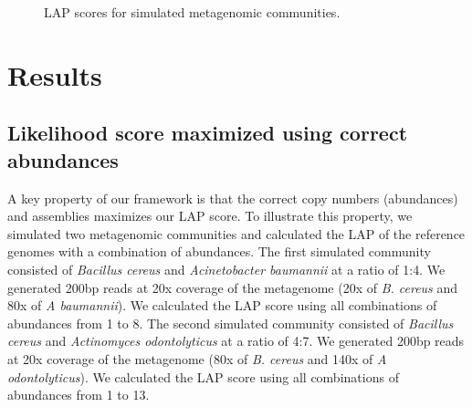 \documentclass[conference]{IEEEtran}
\begin{document}
\begin{figure}[tbhp!]
\centering
\label{fig:ref_abun}

\hfil
{}

\centering \caption{LAP scores for simulated metagenomic communities.}
\end{figure}

\section{Results}
\subsection{Likelihood score maximized using correct abundances}
A key property of our framework is that the correct copy numbers (abundances) and assemblies maximizes our LAP score.
To illustrate this property, we simulated two metagenomic communities and calculated the LAP of the reference genomes with a combination of abundances.
The first simulated community consisted of \emph{Bacillus cereus} and \emph{Acinetobacter baumannii} at a ratio of 1:4.
We generated 200bp reads at 20x coverage of the metagenome (20x of \emph{B. cereus} and 80x of \emph{A baumannii}).
We calculated the LAP score using all combinations of abundances from 1 to 8.
The second simulated community consisted of \emph{Bacillus cereus} and \emph{Actinomyces odontolyticus} at a ratio of 4:7.
We generated 200bp reads at 20x coverage of the metagenome (80x of \emph{B. cereus} and 140x of \emph{A odontolyticus}).
We calculated the LAP score using all combinations of abundances from 1 to 13.
\end{document}
